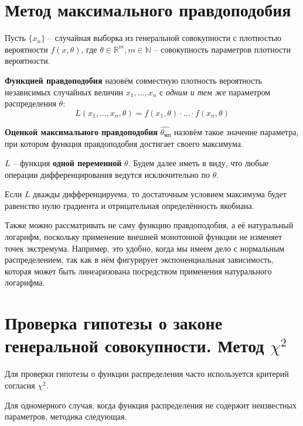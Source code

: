 \section{Метод максимального правдоподобия}
Пусть $\{x_n\}$ -- случайная выборка из генеральной совокупности с плотностью вероятности $f(x, \theta)$, где $\theta \in \mathbb{R}^m, m \in \mathbb{N}$ -- совокупность параметров плотности вероятности.

\begin{definition}
	\textbf{Функцией правдоподобия} назовём совместную плотность вероятность независимых случайных величин $x_1, ..., x_n$ с \textit{одним и тем же} параметром распределения $\theta$:
	\begin{equation}
	L(x_1, ..., x_n, \theta) = f(x_1, \theta) \cdot ... \cdot f(x_n, \theta)
	\end{equation}
\end{definition}

\begin{definition}
	\textbf{Оценкой максимального правдоподобия} $\hat{\theta_{мп}}$ назовём такое значение параметра, при котором функция правдоподобия достигает своего максимума.
\end{definition}

\begin{remark}
	$L$ -- функция \textbf{одной переменной} $\theta$. Будем далее иметь в виду, что любые операции дифференцирования ведутся исключительно по $\theta$.
\end{remark}

Если $L$ дважды дифференцируема, то достаточным условием максимума будет равенство нулю градиента и отрицательная определённость якобиана.

Также можно рассматривать не саму функцию правдоподобия, а её натуральный логарифм, поскольку применение внешней монотонной функции не изменяет точек экстремума. Например, это удобно, когда мы имеем дело с нормальным распределением, так как в нём фигурирует экспоненциальная зависимость, которая может быть линеаризована посредством применения натурального логарифма.

\section{Проверка гипотезы о законе генеральной совокупности. Метод $\chi^2$}

Для проверки гипотезы о функции распределения часто используется критерий согласия $\chi^2$.

Для одномерного случая, когда функция распределения не содержит неизвестных параметров, методика следующая.

